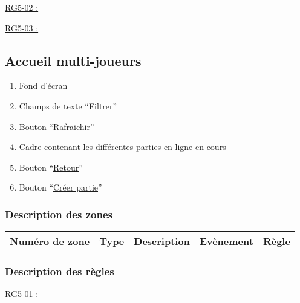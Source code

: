 \documentclass{report}
\begin{document}
			\underline{RG5-02 :}
				\begin{quote}
				
				\end{quote}	
				
			\underline{RG5-03 :}
				\begin{quote}
				
				\end{quote}

\newpage

	\subsection{Accueil multi-joueurs}

		\hypertarget{Accueil multi-joueurs}{}
		\label{Accueil multi-joueurs}

		\begin{center}
			
		\end{center}

		\begin{enumerate}
		  \item Fond d'écran
		  \item Champs de texte ``Filtrer''
		  \item Bouton ``Rafraichir''
		  \item Cadre contenant les différentes parties en ligne en cours
		  \item Bouton ``\hyperlink{Page d'accueil}{Retour}''
		  \item Bouton ``\hyperlink{Creer partie multi-joueurs}{Créer partie}''
		\end{enumerate}

		\subsubsection{Description des zones}

			\begin{tabular}{|c|c|c|c|c|} \hline
				Numéro de zone & Type  & Description & Evènement &	Règle \\\hline
			\end{tabular}

		\subsubsection{Description des règles}

			\underline{RG5-01 :}
				\begin{quote}

				\end{quote}		
	
\end{document}
